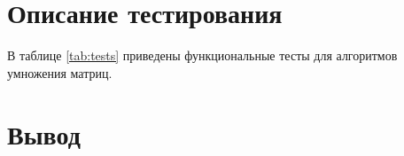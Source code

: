 \section{Описание тестирования}

В таблице \ref{tab:tests} приведены функциональные тесты для алгоритмов
умножения матриц.

\section{Вывод}

